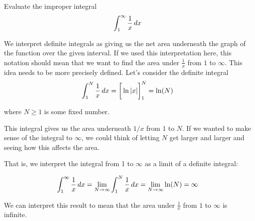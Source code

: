 \documentclass{ximera}
\begin{document}
\begin{example}
Evaluate the improper integral
\[ 
\int_{1}^{\infty} \frac{1}{x} \mathop{}\!d x
\]
\begin{explanation}

We interpret definite integrals as giving us the net area underneath the graph of the function over the given interval. If we used this interpretation here, this notation should mean that we want to find the area under $\frac{1}{x}$ from $1$ to $\infty$.  This idea needs to be more precisely defined.  Let's consider the definite integral
\[
\int_{1}^{N} \frac{1}{x} \mathop{}\!d x=\bigg[ \ln|x| \bigg]_{1}^{N}=\ln(N)
\]

where $N \geq 1$ is some fixed number. 

\begin{image}
\end{image}


 This integral gives us the area underneath $1/x$ from $1$ to $N$. If we wanted to make sense of the integral to $\infty$, we could think of letting $N$ 
get larger and larger and seeing how this affects the area. 

That is, we interpret the integral from 1 to $\infty$ as a limit of a definite integral:

\[
\int_{1}^{\infty} \frac{1}{x} \mathop{}\!d x= \lim_{N \to \infty} \int_{1}^{N} \frac{1}{x} \mathop{}\!d x= \lim_{N \to \infty} \ln(N) = \infty
\]

We can interpret this result to mean that the area under $\frac{1}{x}$ from $1$ to $\infty$ is infinite.
\end{explanation}
\end{example}
\end{document}
